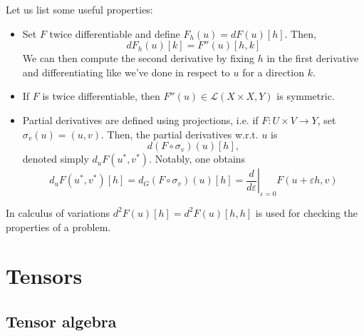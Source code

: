 Let us list some useful properties:
\begin{itemize}
    \item Set $F$ twice differentiable and define $F_h(u)=dF(u)[h]$. Then,
    \[ dF_h(u)[k] = F''(u)[h,k] \] 
    We can then compute the second derivative by fixing $h$ in the first derivative and differentiating like we've done in respect to $u$ for a direction $k$.
    \item If $F$ is twice differentiable, then $F''(u)\in\mathcal{L}(X\times X, Y)$ is symmetric.
    \item Partial derivatives are defined using projections, i.e. if $F: U\times V \to Y$, set $\sigma_v(u)=(u,v)$. Then, the partial derivatives w.r.t. $u$ is
    \[ d(F\circ \sigma_v)(u)[h], \]
    denoted simply $d_u F(u^*,v^*)$. Notably, one obtains
    \[ d_u F(u^*,v^*)[h] = d_G(F\circ \sigma_v)(u)[h] = \left.\frac{d}{d\varepsilon}\right|_{\varepsilon = 0} F(u+\varepsilon h, v) \]
\end{itemize}


In calculus of variations $d^2 F(u)[h] = d^2 F(u)[h,h]$ is used for checking the properties of a problem.




\section{Tensors}
\subsection{Tensor algebra}
